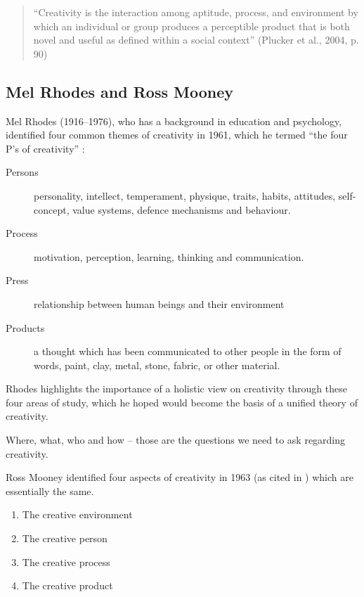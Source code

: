 \begin{quote}
  ``Creativity is the interaction among aptitude, process, and environment by which an individual or group produces a perceptible product that is both novel and useful as defined within a social context'' (Plucker et al., 2004, p. 90) \autocite{Jordanous2012}
\end{quote}


\subsection*{Mel Rhodes and Ross Mooney}

Mel Rhodes (1916--1976), who has a background in education and psychology, identified four common themes of creativity in 1961, which he termed ``the four P’s of creativity'' \autocite{Rhodes1961}:

\begin{description}
  \item [Persons] personality, intellect, temperament, physique, traits, habits, attitudes, self-concept, value systems, defence mechanisms and behaviour.
  \item [Process] motivation, perception, learning, thinking and communication.
  \item [Press] relationship between human beings and their environment
  \item [Products] a thought which has been communicated to other people in the form of words, paint, clay, metal, stone, fabric, or other material.
\end{description}

Rhodes highlights the importance of a holistic view on creativity through these four areas of study, which he hoped would become the basis of a unified theory of creativity.

\begin{draft}
  Where, what, who and how – those are the questions we need to ask regarding creativity.
\end{draft}

Ross Mooney identified four aspects of creativity in 1963 (as cited in \autocite{Sternberg1999}) which are essentially the same.

\begin{enumerate}
  \item The creative environment
  \item The creative person
  \item The creative process
  \item The creative product
\end{enumerate}


